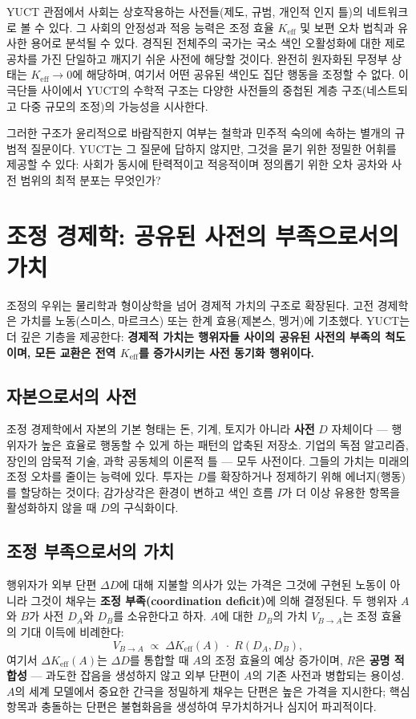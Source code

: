 \documentclass[12pt,a4paper]{article}
\newcommand{\Keff}{K_{\mathrm{eff}}}
\begin{document}
	YUCT 관점에서 사회는 상호작용하는 사전들(제도, 규범, 개인적 인지 틀)의 네트워크로 볼 수 있다. 그 사회의 안정성과 적응 능력은 조정 효율 \(K_{\mathrm{eff}}\) 및 보편 오차 법칙과 유사한 용어로 분석될 수 있다. 경직된 전체주의 국가는 국소 색인 오활성화에 대한 제로 공차를 가진 단일하고 깨지기 쉬운 사전에 해당할 것이다. 완전히 원자화된 무정부 상태는 \(K_{\mathrm{eff}} \to 0\)에 해당하며, 여기서 어떤 공유된 색인도 집단 행동을 조정할 수 없다. 이 극단들 사이에서 YUCT의 수학적 구조는 다양한 사전들의 중첩된 계층 구조(네스트되고 다중 규모의 조정)의 가능성을 시사한다.
	
	그러한 구조가 윤리적으로 바람직한지 여부는 철학과 민주적 숙의에 속하는 별개의 규범적 질문이다. YUCT는 그 질문에 답하지 않지만, 그것을 묻기 위한 정밀한 어휘를 제공할 수 있다: 사회가 동시에 탄력적이고 적응적이며 정의롭기 위한 오차 공차와 사전 범위의 최적 분포는 무엇인가?
	
	\section{조정 경제학: 공유된 사전의 부족으로서의 가치}
	\label{sec:coordination-economics}
	
	조정의 우위는 물리학과 형이상학을 넘어 경제적 가치의 구조로 확장된다. 고전 경제학은 가치를 노동(스미스, 마르크스) 또는 한계 효용(제본스, 멩거)에 기초했다. YUCT는 더 깊은 기층을 제공한다: \textbf{경제적 가치는 행위자들 사이의 공유된 사전의 부족의 척도이며, 모든 교환은 전역 $K_{\mathrm{eff}}$를 증가시키는 사전 동기화 행위이다.}
	
	\subsection{자본으로서의 사전}
	
	조정 경제학에서 자본의 기본 형태는 돈, 기계, 토지가 아니라 \textbf{사전} \(D\) 자체이다 — 행위자가 높은 효율로 행동할 수 있게 하는 패턴의 압축된 저장소. 기업의 독점 알고리즘, 장인의 암묵적 기술, 과학 공동체의 이론적 틀 — 모두 사전이다. 그들의 가치는 미래의 조정 오차를 줄이는 능력에 있다. 투자는 \(D\)를 확장하거나 정제하기 위해 에너지(행동)를 할당하는 것이다; 감가상각은 환경이 변하고 색인 흐름 \(I\)가 더 이상 유용한 항목을 활성화하지 않을 때 \(D\)의 구식화이다.
	
	\subsection{조정 부족으로서의 가치}
	
	행위자가 외부 단편 \(\Delta D\)에 대해 지불할 의사가 있는 가격은 그것에 구현된 노동이 아니라 그것이 채우는 \textbf{조정 부족(coordination deficit)}에 의해 결정된다. 두 행위자 \(A\)와 \(B\)가 사전 \(D_A\)와 \(D_B\)를 소유한다고 하자. \(A\)에 대한 \(D_B\)의 가치 \(V_{B \rightarrow A}\)는 조정 효율의 기대 이득에 비례한다:
	\[
	V_{B \rightarrow A} \; \propto \; \Delta\Keff(A) \; \cdot \; R(D_A, D_B),
	\]
	여기서 \(\Delta\Keff(A)\)는 \(\Delta D\)를 통합할 때 \(A\)의 조정 효율의 예상 증가이며, \(R\)은 \textbf{공명 적합성} — 과도한 잡음을 생성하지 않고 외부 단편이 \(A\)의 기존 사전과 병합되는 용이성. \(A\)의 세계 모델에서 중요한 간극을 정밀하게 채우는 단편은 높은 가격을 지시한다; 핵심 항목과 충돌하는 단편은 불협화음을 생성하여 무가치하거나 심지어 파괴적이다.
	
\end{document}
